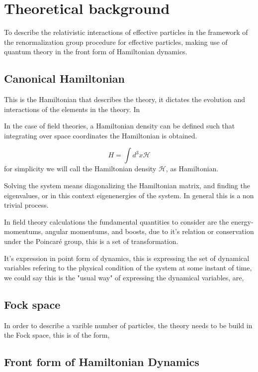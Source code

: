 \documentclass[11pt,a4paper,twoside,pdf]{article}
\numberwithin{equation}{section}
\begin{document}
\section{Theoretical background}

To describe the relativistic interactions of effective particles in the framework of 
the renormalization group procedure for effective particles, making use of quantum 
theory in the front form of Hamiltonian dynamics. 

\subsection{Canonical Hamiltonian}

This is the Hamiltonian that describes the theory, it dictates the evolution and 
interactions of the elements in the theory. In 

In the case of field theories, a Hamiltonian density can be defined such that 
integrating over space coordinates the Hamiltonian is obtained. 

\begin{equation}
    H = \int d^3x \mathcal{H}
\end{equation}
for simplicity we will call the Hamiltonian density $\mathcal{H}$, as Hamiltonian.

Solving the system means diagonalizing the Hamiltonian matrix, and finding the 
eigenvalues, or in this context eigenenergies of the system. In general this is a 
non trivial process.

In field theory calculations the fundamental quantities to consider are the 
energy-momentums, angular momentums, and boosts, due to it's relation or conservation
under the Poincaré group, this is a set of transformation.

It's expression in point form of dynamics, this is expressing the set of dynamical 
variables refering to the physical condition of the system at some instant of time, 
we could say this is the "usual way" of expressing the dynamical variables, are,




\subsection{Fock space}

In order to describe a varible number of particles, the theory needs to be build 
in the Fock space, this is of the form,


\subsection{Front form of Hamiltonian Dynamics}
\end{document}
